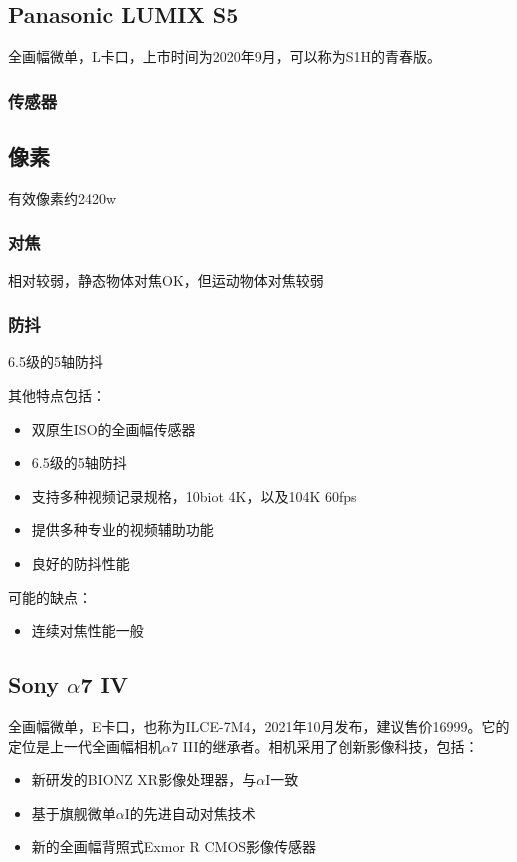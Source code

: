 \documentclass{ctexart}
\begin{document}
\subsection{Panasonic LUMIX S5~\cite{panasonic_lumix_s5} }
全画幅微单，L卡口，上市时间为2020年9月，可以称为S1H的青春版。
\subsubsection{传感器}
\subsection{像素}
有效像素约2420w
\subsubsection{对焦}
相对较弱，静态物体对焦OK，但运动物体对焦较弱
\subsubsection{防抖}
6.5级的5轴防抖

其他特点包括：
\begin{itemize}
    \item 双原生ISO的全画幅传感器
    \item 6.5级的5轴防抖
    \item 支持多种视频记录规格，10biot 4K，以及104K 60fps
    \item 提供多种专业的视频辅助功能
    \item 良好的防抖性能
\end{itemize}
可能的缺点：
\begin{itemize}
    \item 连续对焦性能一般
\end{itemize}

\subsection{Sony $\alpha$7 IV~\cite{sony_alpha7_iv_announment}}
全画幅微单，E卡口，也称为ILCE-7M4，2021年10月发布，建议售价16999。它的定位是上一代全画幅相机$\alpha$7 III的继承者。相机采用了创新影像科技，包括：
\begin{itemize}
    \item 新研发的BIONZ XR影像处理器，与$\alpha$I一致
    \item 基于旗舰微单$\alpha$I的先进自动对焦技术
    \item 新的全画幅背照式Exmor R CMOS影像传感器
\end{itemize}
\end{document}
